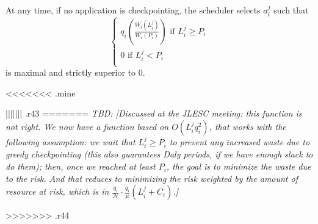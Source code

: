 \documentclass{article}
\newcommand{\nbnodesplat}{{\mathcal N}}
\newcommand{\application}[2]{a_{#1}^{#2}}
\newcommand{\nbnodes}[1]{q_{#1}}
\newcommand{\period}[1]{P_{#1}}
\newcommand{\ckpt}[1]{C_{#1}}
\newcommand{\mtbfplat}{\mu}
\newcommand{\lastckpt}[2]{L_{#1}^{#2}}
\newcommand{\wastefct}[2]{W_{#1}(#2)}
\newcommand{\todo}[1]{\textit{TBD: [#1]}}
\begin{document}
At any time, if no application is checkpointing, the scheduler selects
$\application{i}{j}$ such that 
$$
\left\{
\begin{array}{l}
\nbnodes{i}(\frac{\wastefct{i}{\lastckpt{i}{j}}}{\wastefct{i}{\period{i}}}) \textrm{ if }\lastckpt{i}{j}\geq\period{i}\\
0\textrm{ if }\lastckpt{i}{j}<\period{i}\\
\end{array}\right.$$
is maximal and strictly superior to 0.

<<<<<<< .mine




||||||| .r43
=======
\todo{Discussed at the JLESC meeting: this function is not right. We
  now have a function based on $O(\lastckpt{i}{j}\nbnodes{i}^2)$, that
  works with the following assumption: we wait that $\lastckpt{i}{j}
  \geq \period{i}$ to prevent any increased waste due to greedy
  checkpointing (this also guarantees Daly periods, if we have enough
  slack to do them); then, once we reached at least $\period{i}$, the
  goal is to minimize the waste due to the risk. And that reduces to
  minimizing the risk weighted by the amount of resource at risk, which is in
  $\frac{\nbnodes{i}}{\nbnodesplat}\cdot\frac{\nbnodes{i}}{\mtbfplat}(\lastckpt{i}{j} + \ckpt{i})$.}

>>>>>>> .r44
\end{document}
